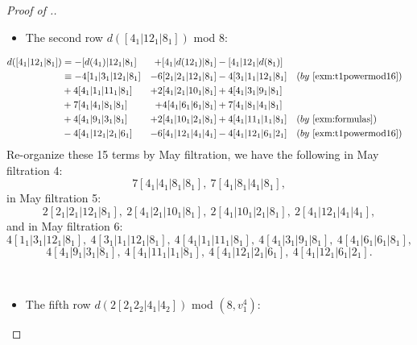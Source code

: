 \begin{proof}[Proof of .]
\begin{itemize}  
\item The second row $d( [ 4_1 | 12_1 | 8_1 ] )$ mod 8: 
\end{itemize}
\begin{align*}
d( [ 4_1 | 12_1 | 8_1 ] ) & = - [d(4_1) | 12_1 | 8_1 ] &+ [4_1 | d(12_1) | 8_1] &- [ 4_1 | 12_1 | d(8_1) ] \\
 & \equiv - 4 [1_1 | 3_1 | 12_1 | 8_1] &- 6 [2_1 | 2_1 | 12_1 | 8_1] &- 4 [3_1 | 1_1 | 12_1 | 8_1] && (by \ \Cref{exm:t1powermod16}) \\
 & + 4 [4_1 | 1_1 | 11_1 | 8_1] &+ 2 [4_1 | 2_1 | 10_1 | 8_1] &+ 4 [4_1 | 3_1 | 9_1 | 8_1] \\
 & + 7 [4_1 | 4_1 | 8_1 | 8_1] &+ 4 [4_1 | 6_1 | 6_1 | 8_1] &+ 7 [4_1 | 8_1 | 4_1 | 8_1] \\
 & + 4 [4_1 | 9_1 | 3_1 | 8_1] &+ 2 [4_1 | 10_1 | 2_1 | 8_1] &+ 4 [4_1 | 11_1 | 1_1 | 8_1]
 && (by \ \Cref{exm:formulas}) \\
 & - 4 [ 4_1 | 12_1 | 2_1 | 6_1 ] &- 6 [ 4_1 | 12_1 | 4_1 | 4_1 ] &- 4 [ 4_1 | 12_1 | 6_1 | 2_1 ] && (by \ \Cref{exm:t1powermod16})
\end{align*}
Re-organize these 15 terms by May filtration, we have the following in May filtration 4:
$$7 [4_1 | 4_1 | 8_1 | 8_1], \ 7 [4_1 | 8_1 | 4_1 | 8_1],$$
in May filtration 5:
$$2 [2_1 | 2_1 | 12_1 | 8_1], \  2 [4_1 | 2_1 | 10_1 | 8_1], \ 2 [4_1 | 10_1 | 2_1 | 8_1], \ 2 [ 4_1 | 12_1 | 4_1 | 4_1 ],$$
and in May filtration 6:
$$4 [1_1 | 3_1 | 12_1 | 8_1], \  4 [3_1 | 1_1 | 12_1 | 8_1], \ 4 [4_1 | 1_1 | 11_1 | 8_1], \ 4 [4_1 | 3_1 | 9_1 | 8_1], \ 4 [4_1 | 6_1 | 6_1 | 8_1],$$  
$$4 [4_1 | 9_1 | 3_1 | 8_1], \ 4 [4_1 | 11_1 | 1_1 | 8_1], \ 4 [ 4_1 | 12_1 | 2_1 | 6_1 ], \ 4 [ 4_1 | 12_1 | 6_1 | 2_1 ].$$

\ \ \\

\begin{itemize}  
\item The fifth row $d(2[2_1 2_2 | 4_1 | 4_2])$ mod $(8, v_1^4)$:
\end{itemize}


\end{proof}
